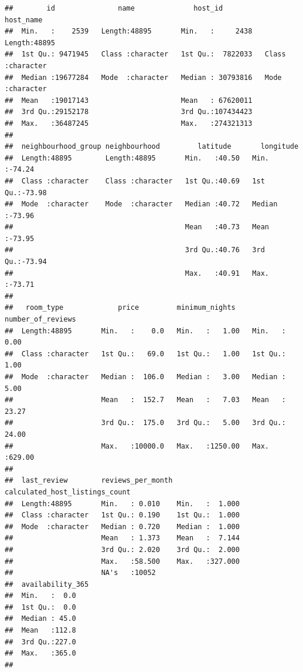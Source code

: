 \documentclass[
]{article}
\begin{document}
\begin{verbatim}
##        id               name              host_id           host_name        
##  Min.   :    2539   Length:48895       Min.   :     2438   Length:48895      
##  1st Qu.: 9471945   Class :character   1st Qu.:  7822033   Class :character  
##  Median :19677284   Mode  :character   Median : 30793816   Mode  :character  
##  Mean   :19017143                      Mean   : 67620011                     
##  3rd Qu.:29152178                      3rd Qu.:107434423                     
##  Max.   :36487245                      Max.   :274321313                     
##                                                                              
##  neighbourhood_group neighbourhood         latitude       longitude     
##  Length:48895        Length:48895       Min.   :40.50   Min.   :-74.24  
##  Class :character    Class :character   1st Qu.:40.69   1st Qu.:-73.98  
##  Mode  :character    Mode  :character   Median :40.72   Median :-73.96  
##                                         Mean   :40.73   Mean   :-73.95  
##                                         3rd Qu.:40.76   3rd Qu.:-73.94  
##                                         Max.   :40.91   Max.   :-73.71  
##                                                                         
##   room_type             price         minimum_nights    number_of_reviews
##  Length:48895       Min.   :    0.0   Min.   :   1.00   Min.   :  0.00   
##  Class :character   1st Qu.:   69.0   1st Qu.:   1.00   1st Qu.:  1.00   
##  Mode  :character   Median :  106.0   Median :   3.00   Median :  5.00   
##                     Mean   :  152.7   Mean   :   7.03   Mean   : 23.27   
##                     3rd Qu.:  175.0   3rd Qu.:   5.00   3rd Qu.: 24.00   
##                     Max.   :10000.0   Max.   :1250.00   Max.   :629.00   
##                                                                          
##  last_review        reviews_per_month calculated_host_listings_count
##  Length:48895       Min.   : 0.010    Min.   :  1.000               
##  Class :character   1st Qu.: 0.190    1st Qu.:  1.000               
##  Mode  :character   Median : 0.720    Median :  1.000               
##                     Mean   : 1.373    Mean   :  7.144               
##                     3rd Qu.: 2.020    3rd Qu.:  2.000               
##                     Max.   :58.500    Max.   :327.000               
##                     NA's   :10052                                   
##  availability_365
##  Min.   :  0.0   
##  1st Qu.:  0.0   
##  Median : 45.0   
##  Mean   :112.8   
##  3rd Qu.:227.0   
##  Max.   :365.0   
## 
\end{verbatim}
\end{document}

